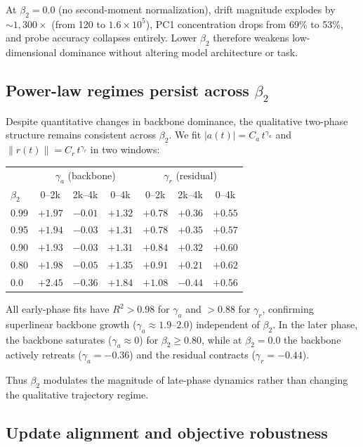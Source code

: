 \documentclass[11pt,a4paper]{article}
\begin{document}
At $\beta_2 = 0.0$ (no second-moment normalization), drift magnitude explodes
by ${\sim}1{,}300\times$ (from 120 to $1.6 \times 10^5$), PC1 concentration
drops from 69\% to 53\%, and probe accuracy collapses entirely.  Lower
$\beta_2$ therefore weakens low-dimensional dominance without altering model
architecture or task.


\subsection{Power-law regimes persist across $\beta_2$}

Despite quantitative changes in backbone dominance, the qualitative two-phase
structure remains consistent across $\beta_2$.  We fit
$|a(t)| = C_a\,t^{\gamma_a}$ and $\|r(t)\| = C_r\,t^{\gamma_r}$ in two
windows:

\begin{center}
\begin{tabular}{lcccccc}
\toprule
 & \multicolumn{3}{c}{$\gamma_a$ (backbone)}
 & \multicolumn{3}{c}{$\gamma_r$ (residual)} \\
$\beta_2$ & 0--2k & 2k--4k & 0--4k & 0--2k & 2k--4k & 0--4k \\
\midrule
0.99 & $+1.97$ & $-0.01$ & $+1.32$ & $+0.78$ & $+0.36$ & $+0.55$ \\
0.95 & $+1.94$ & $-0.03$ & $+1.31$ & $+0.78$ & $+0.35$ & $+0.57$ \\
0.90 & $+1.93$ & $-0.03$ & $+1.31$ & $+0.84$ & $+0.32$ & $+0.60$ \\
0.80 & $+1.98$ & $-0.05$ & $+1.35$ & $+0.91$ & $+0.21$ & $+0.62$ \\
0.0  & $+2.45$ & $-0.36$ & $+1.84$ & $+1.08$ & $-0.44$ & $+0.56$ \\
\bottomrule
\end{tabular}
\end{center}

All early-phase fits have $R^2 > 0.98$ for $\gamma_a$ and $> 0.88$ for
$\gamma_r$, confirming superlinear backbone growth
($\gamma_a \approx 1.9$--$2.0$) independent of $\beta_2$.  In the later phase,
the backbone saturates ($\gamma_a \approx 0$) for $\beta_2 \ge 0.80$, while at
$\beta_2 = 0.0$ the backbone actively retreats ($\gamma_a = -0.36$) and the
residual contracts ($\gamma_r = -0.44$).

Thus $\beta_2$ modulates the magnitude of late-phase dynamics rather than
changing the qualitative trajectory regime.


\subsection{Update alignment and objective robustness}
\end{document}

